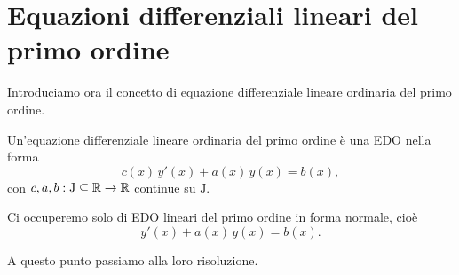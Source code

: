 \documentclass[../../analisi2]{subfiles}
\begin{document}
    \chapter{Equazioni differenziali lineari del primo ordine}

        Introduciamo ora il concetto di equazione differenziale lineare ordinaria del primo ordine.

        \begin{definizione}
            Un'equazione differenziale lineare ordinaria del primo ordine è una EDO nella forma
            \[
                c(x) \, y'(x) + a(x) \, y(x) = b(x),
            \]
            con \(c, a, b : \mathrm{J} \subseteq \mathbb{R} \to \mathbb{R}\) continue su \(\mathrm{J}\).

            Ci occuperemo solo di EDO lineari del primo ordine in forma normale, cioè
            \[
                y'(x) + a(x) \, y(x) = b(x).
            \]
        \end{definizione}

        A questo punto passiamo alla loro risoluzione.
\end{document}
